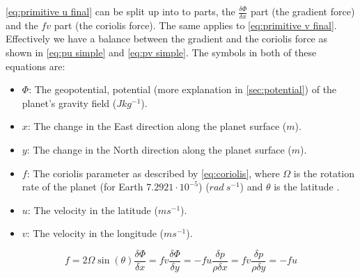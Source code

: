 \autoref{eq:primitive u final} can be split up into to parts, the $\frac{\delta \Phi}{\delta x}$ part (the gradient force) and the $fv$ part (the coriolis force). The same applies to 
\autoref{eq:primitive v final}. Effectively we have a balance between the gradient and the coriolis force as shown in \autoref{eq:pu simple} and \autoref{eq:pv simple}. The symbols in both of 
these equations are:

\begin{itemize}
    \item $\Phi$: The geopotential, potential (more explanation in \autoref{sec:potential}) of the planet's gravity field ($Jkg^{-1}$).
    \item $x$: The change in the East direction along the planet surface ($m$).
    \item $y$: The change in the North direction along the planet surface ($m$).
    \item $f$: The coriolis parameter as described by \autoref{eq:coriolis}, where $\Omega$ is the rotation rate of the planet (for Earth $7.2921 \cdot 10^{-5}$) ($rad \ s^{-1}$) and $\theta$ is the 
    latitude \cite{coriolis}.
    \item $u$: The velocity in the latitude ($ms^{-1}$).
    \item $v$: The velocity in the longitude ($ms^{-1}$).
\end{itemize}

\begin{subequations}
    \begin{equation}
        \label{eq:coriolis}
        f = 2\Omega\sin(\theta)
    \end{equation}
    \begin{equation}
        \label{eq:pu simple}
        \frac{\delta \Phi}{\delta x} = fv
    \end{equation}
    \begin{equation}
        \label{eq:pv simple}
        \frac{\delta \Phi}{\delta y} = -fu
    \end{equation}
    \begin{equation}
        \label{eq:pu simple final}
        \frac{\delta p}{\rho \delta x} = fv
    \end{equation}
    \begin{equation}
        \label{eq:pv simple final}
        \frac{\delta p}{\rho \delta y} = -fu
    \end{equation}
\end{subequations}

